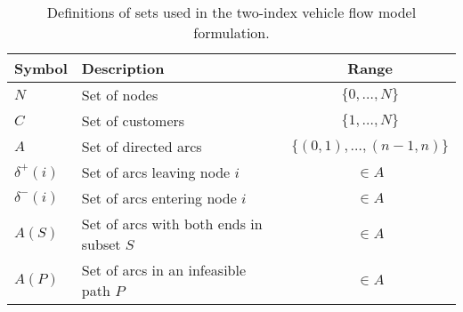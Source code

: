 \begin{table}[ht]
    \centering
    \begin{tabular}{llc}
        \toprule
        Symbol        & Description                              & Range                         \\
        \midrule
        $N$           & Set of nodes                             & $\{ 0, \dots, N \}$           \\
        $C$           & Set of customers                         & $\{ 1, \dots, N \} $          \\
        $A$           & Set of directed arcs                     & $\{(0,1), \dots, (n-1, n) \}$ \\
        $\delta^+(i)$ & Set of arcs leaving node $i$             & $\in A$                       \\
        $\delta^-(i)$ & Set of arcs entering node $i$            & $\in A$                       \\
        $A(S)$        & Set of arcs with both ends in subset $S$ & $\in A$                       \\
        $A(P)$        & Set of arcs in an infeasible path $P$    & $\in A$                       \\
        \bottomrule
    \end{tabular}
    \caption{Definitions of sets used in the two-index vehicle flow model formulation.}
    \label{tab:set_definitions}
\end{table}
\clearpage
